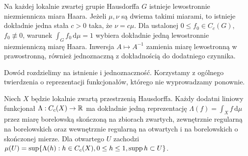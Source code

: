 \begin{twierdzenie}[Haara]
Na każdej lokalnie zwartej grupie Hausdorffa $G$ istnieje lewostronnie niezmiennicza miara Haara. Jeżeli $\mu,\nu$ są dwiema takimi miarami, to istnieje dokładnie jedna stała $c>0$ taka, że $\nu=c\mu$. Dla ustalonej $0\le f_0\in C_c(G)$, $f_0\not\equiv0$, warunek $\int_G f_0\,\mathrm d\mu=1$ wybiera dokładnie jedną lewostronnie niezmienniczą miarę Haara. Inwersja $A\mapsto A^{-1}$ zamienia miarę lewostronną w prawostronną, również jednoznaczną z dokładnością do dodatniego czynnika.
\end{twierdzenie}
Dowód rozdzielimy na istnienie i jednoznaczność. Korzystamy z ogólnego twierdzenia o reprezentacji funkcjonałów, którego nie wyprowadzamy ponownie.
\begin{twierdzenie}
Niech $X$ będzie lokalnie zwartą przestrzenią Hausdorffa. Każdy dodatni liniowy funkcjonał $\Lambda:C_c(X)\to\mathbb R$ ma dokładnie jedną reprezentację $\Lambda(f)=\int_X f\,\mathrm d\mu$ przez miarę borelowską skończoną na zbiorach zwartych, zewnętrznie regularną na borelowskich oraz wewnętrznie regularną na otwartych i na borelowskich o skończonej mierze. Dla otwartego $U$ zachodzi
$\mu(U)=\sup\{\Lambda(h):h\in C_c(X),0\le h\le1,\operatorname{supp} h\subset U\}$.
\end{twierdzenie}
